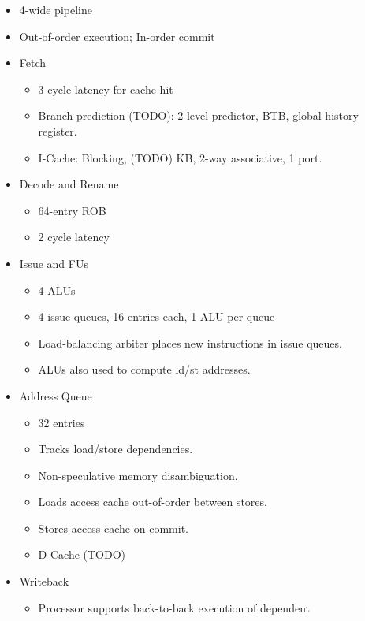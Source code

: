 \documentclass{article}
\begin{document}
\begin{itemize}
    \item 4-wide pipeline
    \item Out-of-order execution; In-order commit
    \item Fetch
        \begin{itemize}
            \item 3 cycle latency for cache hit
            \item Branch prediction (TODO): 2-level predictor, BTB, global
                history register.
            \item I-Cache: Blocking, (TODO) KB, 2-way associative, 1 port.
        \end{itemize}
    \item Decode and Rename
        \begin{itemize}
            \item 64-entry ROB
            \item 2 cycle latency
        \end{itemize}
    \item Issue and FUs
        \begin{itemize}
            \item 4 ALUs
            \item 4 issue queues, 16 entries each, 1 ALU per queue
            \item Load-balancing arbiter places new instructions in issue
                queues.
            \item ALUs also used to compute ld/st addresses.
        \end{itemize}
    \item Address Queue
        \begin{itemize}
            \item 32 entries
            \item Tracks load/store dependencies.
            \item Non-speculative memory disambiguation.
            \item Loads access cache out-of-order between stores.
            \item Stores access cache on commit.
            \item D-Cache (TODO)
        \end{itemize}
    \item Writeback
        \begin{itemize}
            \item Processor supports back-to-back execution of dependent

\end{itemize}
\end{itemize}
\end{document}
